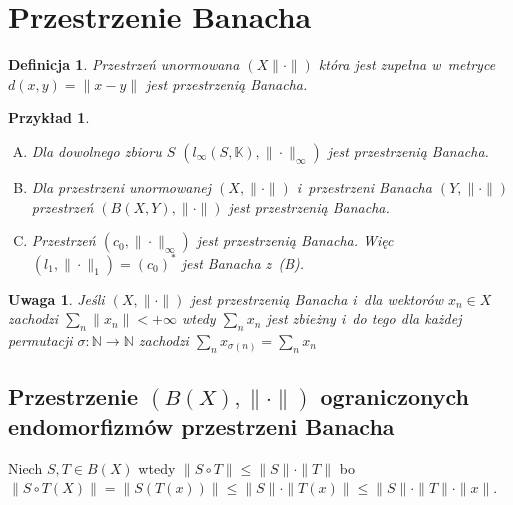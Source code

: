 \documentclass[11pt]{mwrep}
\renewcommand{\[}{\begin{equation}}
\renewcommand{\]}{\end{equation}}
\newcommand{\N}{{\ensuremath{\mathbb N}}}
\newcommand{\K}{\ensuremath{\mathbb{K}}}
\newcommand{\norm}{\|\cdot\|}
\newtheorem{uwaga}[subsection]{Uwaga}
\newtheorem{de}[subsection]{Definicja}
\newtheorem{ex}[subsection]{Przykład}
\newcounter{numer}
\begin{document}
\section{Przestrzenie Banacha}
\begin{de}
	Przestrzeń unormowana $(X\norm )$ która jest zupełna w~metryce $d(x,y) = \|x- y\|$ jest przestrzenią Banacha.
\end{de}
\begin{ex}
	\begin{enumerate}[(A)]
		\item Dla dowolnego zbioru $S$ $\left( l_\infty(S,\K),\norm_\infty \right)$ jest przestrzenią Banacha. 
		\item Dla przestrzeni unormowanej  $(X,\norm)$ i~przestrzeni Banacha $(Y,\norm)$ przestrzeń $\left( B(X,Y), \norm \right)$ 
			jest przestrzenią Banacha.
		\item Przestrzeń $(c_0, \norm_\infty)$ jest przestrzenią Banacha. Więc $(l_1,\norm_1)= (c_0)^*$ jest Banacha  z~(B).
	\end{enumerate}
\end{ex}
\begin{uwaga}
	Jeśli $(X,\norm)$ jest przestrzenią Banacha i~dla wektorów $x_n \in X$ zachodzi $\sum_n \|x_n\| < +\infty$ wtedy 
	$\sum_n x_n$ jest zbieżny i~do tego dla każdej permutacji $\sigma\colon \N\to\N$ zachodzi $\sum_n x_{\sigma(n)} = \sum_n x_n$
\end{uwaga}
\subsection{Przestrzenie $(B(X),\norm)$ ograniczonych endomorfizmów przestrzeni Banacha}
Niech $S,T \in B(X)$ wtedy $\|S\circ T\| \le \|S\| \cdot \|T\|$ bo 
$\|S\circ T (X) \|= \| S(T(x))\| \le \|S\|\cdot \|T(x)\| \le \|S\| \cdot \|T\| \cdot \|x\|$.
\end{document}
